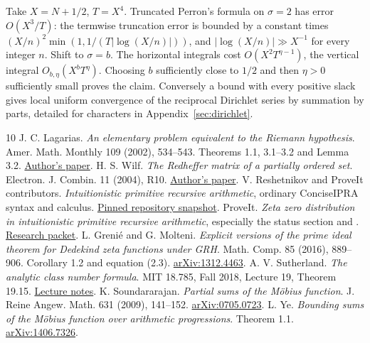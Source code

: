 \documentclass[11pt]{article}
\begin{document}
Take \(X=N+1/2\), \(T=X^4\). Truncated Perron's formula on \(\sigma=2\) has error \(O(X^3/T)\): the termwise truncation error is bounded by a constant times \((X/n)^2\min(1,1/(T|\log(X/n)|))\), and \(|\log(X/n)|\gg X^{-1}\) for every integer \(n\). Shift to \(\sigma=b\). The horizontal integrals cost \(O(X^2 T^{\eta-1})\), the vertical integral \(O_{b,\eta}(X^bT^\eta)\). Choosing \(b\) sufficiently close to \(1/2\) and then \(\eta>0\) sufficiently small proves the claim. Conversely a bound with every positive slack gives local uniform convergence of the reciprocal Dirichlet series by summation by parts, detailed for characters in Appendix~\ref{sec:dirichlet}.


\begin{thebibliography}{10}\small
{} J. C. Lagarias. \emph{An elementary problem equivalent to the Riemann hypothesis}. Amer. Math. Monthly 109 (2002), 534--543. Theorems 1.1, 3.1--3.2 and Lemma 3.2. \href{https://arxiv.org/abs/math/0008177}{Author's paper}.
 H. S. Wilf. \emph{The Redheffer matrix of a partially ordered set}. Electron. J. Combin. 11 (2004), R10. \href{https://arxiv.org/abs/math/0408263}{Author's paper}.
 V. Reshetnikov and ProveIt contributors. \emph{Intuitionistic primitive recursive arithmetic}, ordinary ConciseIPRA syntax and calculus. \href{https://github.com/VladimirReshetnikov/ProveIt/tree/ce0e3ceaf41a83e653857e5f60e0460733cc230c/Logic/PrimitiveRecursiveArithmetic}{Pinned repository snapshot}.
 ProveIt. \emph{Zeta zero distribution in intuitionistic primitive recursive arithmetic}, especially the status section and . \href{https://github.com/VladimirReshetnikov/ProveIt/tree/ce0e3ceaf41a83e653857e5f60e0460733cc230c/Logic/PrimitiveRecursiveArithmetic/docs/proofs/analytic-number-theory/zeta_zeros_ipra_2026-11-15}{Research packet}.
 L. Greni\'e and G. Molteni. \emph{Explicit versions of the prime ideal theorem for Dedekind zeta functions under GRH}. Math. Comp. 85 (2016), 889--906. Corollary 1.2 and equation (2.3). \href{https://arxiv.org/abs/1312.4463}{arXiv:1312.4463}.
 A. V. Sutherland. \emph{The analytic class number formula}. MIT 18.785, Fall 2018, Lecture 19, Theorem 19.15. \href{https://math.mit.edu/classes/18.785/2018fa/LectureNotes19.pdf}{Lecture notes}.
 K. Soundararajan. \emph{Partial sums of the M\"obius function}. J. Reine Angew. Math. 631 (2009), 141--152. \href{https://arxiv.org/abs/0705.0723}{arXiv:0705.0723}.
 L. Ye. \emph{Bounding sums of the M\"obius function over arithmetic progressions}. Theorem 1.1. \href{https://arxiv.org/abs/1406.7326}{arXiv:1406.7326}.
\end{thebibliography}
\end{document}

